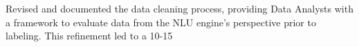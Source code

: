 \documentclass[theme]{cv_einstein}
\begin{document}
\begin{paracol}{2}
\begin{rightcolumn}
{Revised and documented the data cleaning process, providing Data Analysts with a framework to evaluate data from the NLU engine’s perspective prior to labeling. This refinement led to a 10-15%

}


\end{rightcolumn}
\end{paracol}
\end{document}
